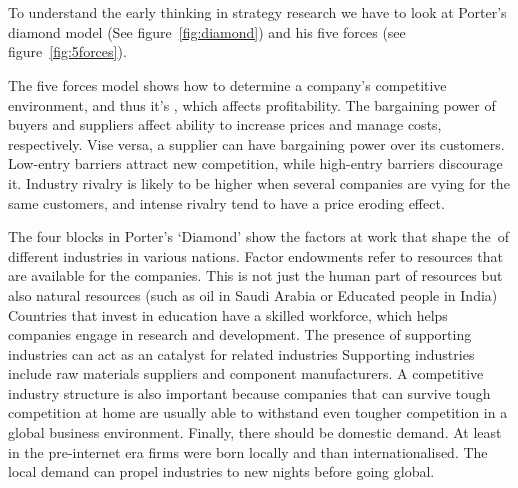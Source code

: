 \section{}\label{Ch:Porter}


To understand the early thinking in strategy research we have to look at Porter's diamond model (See figure~\ref{fig:diamond}) and his five forces (see figure~\ref{fig:5forces}).  


The five forces model shows how to determine a company's competitive environment, and thus it's \ca, which affects profitability. 
The bargaining power of buyers and suppliers affect ability to increase prices and manage costs, respectively. 
Vise versa, a supplier can have bargaining power over its customers. Low-entry barriers attract new competition, while high-entry barriers discourage it. 
Industry rivalry is likely to be higher when several companies are vying for the same customers, and intense rivalry tend to have a price eroding effect.


The four blocks in Porter's `Diamond' show the factors at work that shape the~\ca of different industries in various nations.
Factor endowments refer to resources that are available for the companies. 
This is not just the human part of resources but also natural resources (such as oil in Saudi Arabia or Educated people in India)
Countries that invest in education have a skilled workforce, which helps companies engage in research and development. 
The presence of supporting industries can act as an catalyst for related industries
Supporting industries include raw materials suppliers and component manufacturers. 
A competitive industry structure is also important because companies that can survive tough competition at home are usually able to withstand even tougher competition in a global business environment.
Finally, there should be domestic demand. 
At least in the pre-internet era firms were born locally and than internationalised. The local demand can propel industries to new nights before going global.